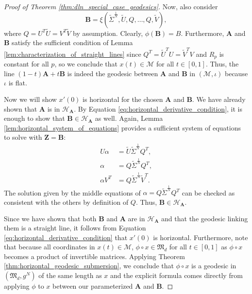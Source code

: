 \documentclass{amsart}
\theoremstyle{definition}
\theoremstyle{remark}
\numberwithin{equation}{section}
\begin{document}
\begin{proof}[Proof of Theorem \ref{thm:dln_special_case_geodesics}]
    Now, also consider \begin{equation}\label{eq:underline_B_parameterization}
        \mathbf{B} = \xi\left(\tilde{\Sigma}^\frac{1}{N}, \tilde{U}, Q, \ldots, Q, \tilde{V}\right),
    \end{equation}
    where $Q = U^T\tilde{U} = V^T\tilde{V}$ by assumption. Clearly, $\phi(\mathbf{B}) = B$. Furthermore, $\mathbf{A}$ and $\mathbf{B}$ satisfy the sufficient condition of Lemma \ref{lem:characterization_of_straight_lines} since $Q^T = \tilde{U}^TU = \tilde{V}^TV$ and $R_p$ is constant for all $p$, so we conclude that $x(t) \in \mathcal{M}$ for all $t \in [0, 1]$. Thus, the line $(1-t)\mathbf{A} + t\mathbf{B}$ is indeed the geodesic between $\mathbf{A}$ and $\mathbf{B}$ in $(\mathcal{M}, \iota)$ because $\iota$ is flat.

    Now we will show $x'(0)$ is horizontal for the chosen $\mathbf{A}$ and $\mathbf{B}$. We have already shown that $\mathbf{A}$ is in $\mathcal{H}_\mathbf{A}$. By Equation \ref{eq:horizontal_derivative_condition}, it is enough to show that $\mathbf{B} \in \mathcal{H}_\mathbf{A}$ as well. Again, Lemma \ref{lem:horizontal_system_of_equations} provides a sufficient system of equations to solve with $\mathbf{Z} = \mathbf{B}$:
    \begin{align}
        U\alpha &= \tilde{U}\tilde{\Sigma}^\frac{1}{N}Q^T,\\
        \alpha &= Q \tilde{\Sigma}^\frac{1}{N} Q^T, \\
        \alpha V^T &= Q \tilde{\Sigma}^\frac{1}{N} \tilde{V}^T.
    \end{align}
    The solution given by the middle equations of $\alpha = Q\tilde{\Sigma}^\frac{1}{N}Q^T$ can be checked as consistent with the others by definition of $Q$. Thus, $\mathbf{B} \in \mathcal{H}_{\mathbf{A}}$.
    
    Since we have shown that both $\mathbf{B}$ and $\mathbf{A}$ are in $\mathcal{H}_{\mathbf{A}}$ and that the geodesic linking them is a straight line, it follows from Equation \ref{eq:horizontal_derivative_condition} that $x'(0)$ is horizontal. 
    Furthermore, note that because all coordinates in $x(t) \in \mathcal{M}$, $\phi \circ x \in \mathfrak{M}_d$ for all $t \in [0, 1]$ as $\phi \circ x$ becomes a product of invertible matrices. Applying Theorem \ref{thm:horizontal_geodesic_submersion}, we conclude that $\phi \circ x$ is a geodesic in $(\mathfrak{M}_d, g^N)$ of the same length as $x$ and the explicit formula comes directly from applying $\phi$ to $x$ between our parameterized $\mathbf{A}$ and $\mathbf{B}$.
\end{proof}
\end{document}
